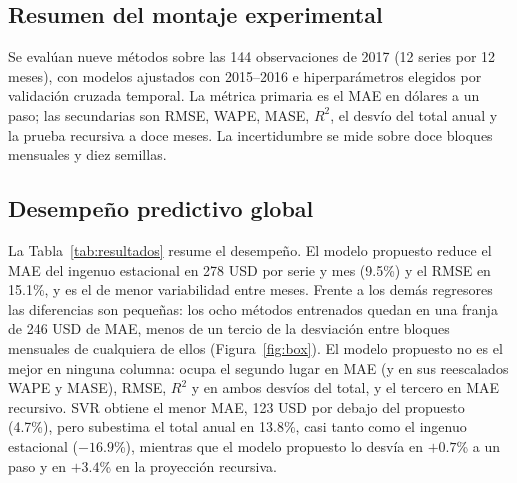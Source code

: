 \documentclass[pdflatex,sn-mathphys-num]{sn-jnl}
\begin{document}
\subsection{Resumen del montaje experimental}\label{subsec:montaje}

Se evalúan nueve métodos sobre las 144 observaciones de 2017 (12 series por 12 meses), con modelos ajustados con 2015--2016 e hiperparámetros elegidos por validación cruzada temporal. La métrica primaria es el MAE en dólares a un paso; las secundarias son RMSE, WAPE, MASE, $R^2$, el desvío del total anual y la prueba recursiva a doce meses. La incertidumbre se mide sobre doce bloques mensuales y diez semillas.

\subsection{Desempeño predictivo global}\label{subsec:global}

La Tabla~\ref{tab:resultados} resume el desempeño. El modelo propuesto reduce el MAE del ingenuo estacional en 278 USD por serie y mes (9.5\%) y el RMSE en 15.1\%, y es el de menor variabilidad entre meses. Frente a los demás regresores las diferencias son pequeñas: los ocho métodos entrenados quedan en una franja de 246 USD de MAE, menos de un tercio de la desviación entre bloques mensuales de cualquiera de ellos (Figura~\ref{fig:box}). El modelo propuesto no es el mejor en ninguna columna: ocupa el segundo lugar en MAE (y en sus reescalados WAPE y MASE), RMSE, $R^2$ y en ambos desvíos del total, y el tercero en MAE recursivo. SVR obtiene el menor MAE, 123 USD por debajo del propuesto (4.7\%), pero subestima el total anual en 13.8\%, casi tanto como el ingenuo estacional ($-16.9$\%), mientras que el modelo propuesto lo desvía en $+0.7$\% a un paso y en $+3.4$\% en la proyección recursiva.
\end{document}
